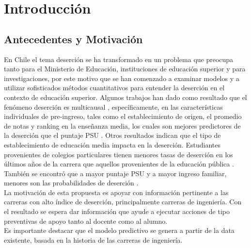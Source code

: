 \chapter[Introducción]{Introducción}
\label{ch:intro}



\section{Antecedentes y Motivación}
\label{sec:motivacion}

En Chile el tema deserción se ha transformado en un problema que preocupa tanto para el Ministerio de Educación, instituciones de educación superior y para investigaciones, por este motivo que se han comenzado a examinar modelos y a utilizar sofisticados métodos cuantitativos para entender la deserción en el contexto de educación superior. Algunos trabajos han dado como resultado que el fenómeno deserción es multicausal \cite{acuna}, específicamente, en las características individuales de pre-ingreso, tales como el establecimiento de origen, el promedio de notas y ranking en la enseñanza media, los cuales son mejores predictores de la deserción que el puntaje PSU  \cite{larroucau}. Otros resultados indican que el tipo de establecimiento de educación media impacta en la deserción. Estudiantes provenientes de colegios particulares tienen menores tasas de deserción en los últimos años de la carrera que aquellos provenientes de la educación pública \cite{celis}. También se encontró que a mayor puntaje PSU y a mayor ingreso familiar, menores son las probabilidades de deserción \cite{diaz}. \\

La motivación de esta propuesta es apoyar con información pertinente a las carreras con alto índice de deserción, principalmente carreras de ingeniería. Con el resultado se espera dar información que ayude a ejecutar acciones de tipo preventivas de apoyo tanto al docente como al alumno.\\ 

Es importante destacar que el modelo predictivo se genera a partir de la data existente, basada en la historia de las carreras de ingeniería.\\







